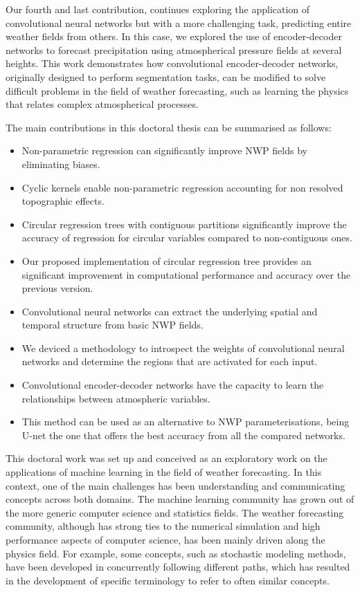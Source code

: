 \medskip

Our fourth and last contribution, continues exploring the application of convolutional neural networks but with a more challenging task, predicting entire weather fields from  others. In this case, we explored the use of encoder-decoder networks to forecast precipitation using atmospherical pressure fields at several heights. This work demonstrates how convolutional encoder-decoder networks, originally designed to perform segmentation tasks, can be modified to solve difficult problems in the field of weather forecasting, such as learning the physics that relates complex atmospherical processes.

\bigskip
\bigskip
\bigskip

The main contributions in this doctoral thesis can be summarised as follows:

\begin{itemize}
  \item Non-parametric regression can significantly improve NWP fields by eliminating biases.
  \item Cyclic kernels enable non-parametric regression accounting for non resolved topographic effects.
  \item Circular regression trees with contiguous partitions significantly improve the accuracy of regression for circular variables compared to non-contiguous ones.
  \item Our proposed implementation of circular regression tree provides an significant improvement in computational performance and accuracy over the previous version.
  \item Convolutional neural networks can extract the underlying spatial and temporal structure from basic NWP fields.
  \item We deviced a methodology to introspect the weights of convolutional neural networks and determine the regions that are activated for each input.
  \item Convolutional encoder-decoder networks have the capacity to learn the relationships between atmospheric variables. 
  \item This method can be used as an alternative to NWP parameterisations, being U-net the one that offers the best accuracy from all the compared networks.
\end{itemize}

\medskip

This doctoral work was set up and conceived as an exploratory work on the applications of machine learning in the field of weather forecasting. In this context, one of the main challenges has been understanding and communicating concepts across both domains. The machine learning community has grown out of the more generic computer science and statistics fields. The weather forecasting community, although has strong ties to the numerical simulation and high performance aspects of computer science, has been mainly driven along the physics field. For example, some concepts, such as stochastic modeling methods, have been developed in concurrently following different paths, which has resulted in the development of specific terminology to refer to often similar concepts.

